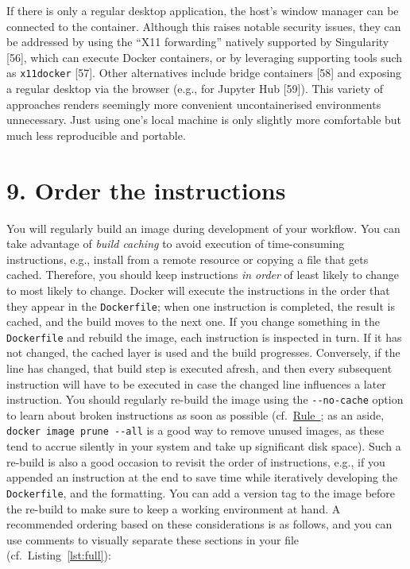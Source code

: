 \documentclass[10pt,letterpaper]{article}
\begin{document}
\normalsize

If there is only a regular desktop application, the host's window
manager can be connected to the container. Although this raises notable
security issues, they can be addressed by using the ``X11 forwarding''
natively supported by Singularity {[}56{]}, which can execute Docker
containers, or by leveraging supporting tools such as \texttt{x11docker}
{[}57{]}. Other alternatives include bridge containers {[}58{]} and
exposing a regular desktop via the browser (e.g., for Jupyter Hub
{[}59{]}). This variety of approaches renders seemingly more convenient
uncontainerised environments unnecessary. Just using one's local machine
is only slightly more comfortable but much less reproducible and
portable.

\hypertarget{order-the-instructions}{%
\section{9. Order the instructions}\label{order-the-instructions}}

  \label{rule:order} 

You will regularly build an image during development of your workflow.
You can take advantage of \emph{build caching} to avoid execution of
time-consuming instructions, e.g., install from a remote resource or
copying a file that gets cached. Therefore, you should keep instructions
\emph{in order} of least likely to change to most likely to change.
Docker will execute the instructions in the order that they appear in
the \texttt{Dockerfile}; when one instruction is completed, the result
is cached, and the build moves to the next one. If you change something
in the \texttt{Dockerfile} and rebuild the image, each instruction is
inspected in turn. If it has not changed, the cached layer is used and
the build progresses. Conversely, if the line has changed, that build
step is executed afresh, and then every subsequent instruction will have
to be executed in case the changed line influences a later instruction.
You should regularly re-build the image using the \texttt{-\/-no-cache}
option to learn about broken instructions as soon as possible
(cf.~\hyperref[{rule:usage}]{Rule~}; as an aside,
\texttt{docker\ image\ prune\ -\/-all} is a good way to remove unused
images, as these tend to accrue silently in your system and take up
significant disk space). Such a re-build is also a good occasion to
revisit the order of instructions, e.g., if you appended an instruction
at the end to save time while iteratively developing the
\texttt{Dockerfile}, and the formatting. You can add a version tag to
the image before the re-build to make sure to keep a working environment
at hand. A recommended ordering based on these considerations is as
follows, and you can use comments to visually separate these sections in
your file (cf.~Listing~\ref{lst:full}):
\end{document}
